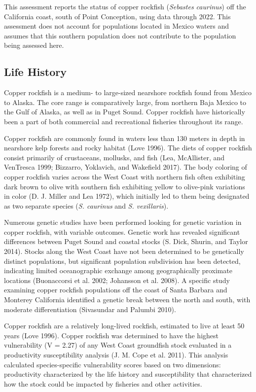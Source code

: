 \documentclass[11pt,
  english,
  letterpaper,
]{article}
\begin{document}
This assessment reports the status of copper rockfish (\emph{Sebastes caurinus}) off the California coast, south of Point Conception, using data through 2022. This assessment does not account for populations located in Mexico waters and assumes that this southern population does not contribute to the population being assessed here.

\hypertarget{life-history}{%
\subsection{Life History}\label{life-history}}

Copper rockfish is a medium- to large-sized nearshore rockfish found from Mexico to Alaska. The core range is comparatively large, from northern Baja Mexico to the Gulf of Alaska, as well as in Puget Sound. Copper rockfish have historically been a part of both commercial and recreational fisheries throughout its range.

Copper rockfish are commonly found in waters less than 130 meters in depth in nearshore kelp forests and rocky habitat (Love 1996). The diets of copper rockfish consist primarily of crustaceans, mollusks, and fish (Lea, McAllister, and VenTresca 1999; Bizzarro, Yoklavich, and Wakefield 2017). The body coloring of copper rockfish varies across the West Coast with northern fish often exhibiting dark brown to olive with southern fish exhibiting yellow to olive-pink variations in color (D. J. Miller and Lea 1972), which initially led to them being designated as two separate species (\emph{S. caurinus} and \emph{S. vexillaris}).

Numerous genetic studies have been performed looking for genetic variation in copper rockfish, with variable outcomes. Genetic work has revealed significant differences between Puget Sound and coastal stocks (S. Dick, Shurin, and Taylor 2014). Stocks along the West Coast have not been determined to be genetically distinct populations, but significant population subdivision has been detected, indicating limited oceanographic exchange among geographically proximate locations (Buonaccorsi et al. 2002; Johansson et al. 2008). A specific study examining copper rockfish populations off the coast of Santa Barbara and Monterey California identified a genetic break between the north and south, with moderate differentiation (Sivasundar and Palumbi 2010).

Copper rockfish are a relatively long-lived rockfish, estimated to live at least 50 years (Love 1996). Copper rockfish was determined to have the highest vulnerability (V = 2.27) of any West Coast groundfish stock evaluated in a productivity susceptibility analysis (J. M. Cope et al. 2011). This analysis calculated species-specific vulnerability scores based on two dimensions: productivity characterized by the life history and susceptibility that characterized how the stock could be impacted by fisheries and other activities.
\end{document}
